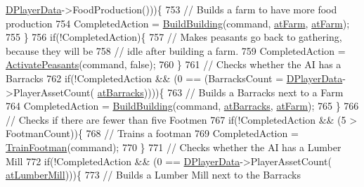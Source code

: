 \begin{DoxyCode}
      \hyperlink{classCAIPlayer_a83b5113c8f7e80df54940b647c5ee2e6}{DPlayerData}->FoodProduction()))\{
753                 \textcolor{comment}{// Builds a farm to have more food production}
754                 CompletedAction = \hyperlink{classCAIPlayer_a2ff5263cbaa6bfc62ffec4dbce87ba88}{BuildBuilding}(command, \hyperlink{GameDataTypes_8h_a5600d4fc433b83300308921974477feca406eab24dcbad1858522aca11b1088f5}{atFarm}, 
      \hyperlink{GameDataTypes_8h_a5600d4fc433b83300308921974477feca406eab24dcbad1858522aca11b1088f5}{atFarm});
755             \}
756             \textcolor{keywordflow}{if}(!CompletedAction)\{
757                 \textcolor{comment}{// Makes peasants go back to gathering, because they will be}
758                 \textcolor{comment}{// idle after building a farm.}
759                 CompletedAction = \hyperlink{classCAIPlayer_a3fab1c955fd68bb53fa80bb1872d2819}{ActivatePeasants}(command, \textcolor{keyword}{false});
760             \}
761             \textcolor{comment}{// Checks whether the AI has a Barracks}
762             \textcolor{keywordflow}{if}(!CompletedAction && (0 == (BarracksCount = \hyperlink{classCAIPlayer_a83b5113c8f7e80df54940b647c5ee2e6}{DPlayerData}->PlayerAssetCount(
      \hyperlink{GameDataTypes_8h_a5600d4fc433b83300308921974477feca1cbf6c944f30d615a247eef1f57b2230}{atBarracks}))))\{
763                 \textcolor{comment}{// Builds a Barracks next to a Farm}
764                 CompletedAction = \hyperlink{classCAIPlayer_a2ff5263cbaa6bfc62ffec4dbce87ba88}{BuildBuilding}(command, \hyperlink{GameDataTypes_8h_a5600d4fc433b83300308921974477feca1cbf6c944f30d615a247eef1f57b2230}{atBarracks}, 
      \hyperlink{GameDataTypes_8h_a5600d4fc433b83300308921974477feca406eab24dcbad1858522aca11b1088f5}{atFarm});
765             \}
766             \textcolor{comment}{// Checks if there are fewer than five Footmen}
767             \textcolor{keywordflow}{if}(!CompletedAction && (5 > FootmanCount))\{
768                 \textcolor{comment}{// Trains a footman}
769                 CompletedAction = \hyperlink{classCAIPlayer_aa3f9c1d0d449a45a24e065d2086527b0}{TrainFootman}(command);
770             \}
771             \textcolor{comment}{// Checks whether the AI has a Lumber Mill}
772             \textcolor{keywordflow}{if}(!CompletedAction && (0 == \hyperlink{classCAIPlayer_a83b5113c8f7e80df54940b647c5ee2e6}{DPlayerData}->PlayerAssetCount(
      \hyperlink{GameDataTypes_8h_a5600d4fc433b83300308921974477feca7bb38316bc3193b5c9ec67ea6aad549c}{atLumberMill})))\{
773                 \textcolor{comment}{// Builds a Lumber Mill next to the Barracks}

\end{DoxyCode}
